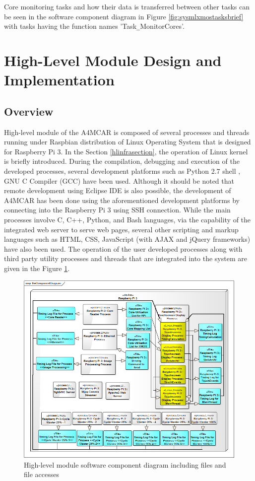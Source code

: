 Core monitoring tasks and how their data is transferred between other tasks can be seen in the software component diagram in Figure \ref{fig:sysmlxmostasksbrief} with tasks having the function names 'Task\texttt{\_}MonitorCores'.

\section{High-Level Module Design and Implementation}
\subsection{Overview}
High-level module of the A4MCAR is composed of several processes and threads running under Raspbian \cite{raspbiandownload} distribution of Linux Operating System that is designed for Raspberry Pi 3. In the Section \ref{hlinfrasection}, the operation of Linux kernel is briefly introduced. During the compilation, debugging and execution of the developed processes, several development platforms such as Python 2.7 shell \cite{python27}, GNU C Compiler (GCC) \cite{gcc} have been used. Although it should be noted that remote development using Eclipse IDE \cite{remotedebuggingeclipse} is also possible, the development of A4MCAR has been done using the aforementioned development platforms by connecting into the Raspberry Pi 3 using SSH connection. While the main processes involve C, C++, Python, and Bash \cite{bash} languages, via the capability of the integrated web server to serve web pages, several other scripting and markup languages such as HTML, CSS, JavaScript (with AJAX \cite{howajaxworks} and jQuery \cite{jquery} frameworks) have also been used. The operation of the user developed processes along with third party utility processes and threads that are integrated into the system are given in the Figure \ref{fig:rpicomponents}. 
\begin{figure}[!ht]
	\centering
	\captionsetup{justification=centering}
	\includegraphics[width=\textwidth]{content/images/rpicomponents.png}
	\caption{High-level module software component diagram including files and file accesses}
	\label{fig:rpicomponents}
\end{figure}

